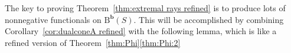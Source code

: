 \documentclass[12pt]{amsart}
\newtheorem{lemma}{Lemma}[section]
\theoremstyle{definition}
\theoremstyle{remark}
\newcommand{\PP}{\mathbb{P}}
\newcommand{\bb}{\mathbf{b}}
\newcommand{\cE}{\mathcal{E}}
\newcommand{\FF}{\mathbf{F}}
\newcommand{\DD}{\mathrm{D}}
\newcommand{\BBQ}{\mathrm{B}}
\begin{document}
The key to proving Theorem~\ref{thm:extremal rays refined} is to produce lots of nonnegative functionals on $\BBQ^{\bb}(S)$.  This will be accomplished by combining Corollary~\ref{cor:dualconeA refined} with the following lemma, which is like a refined version of Theorem~\ref{thm:Phi}\eqref{thm:Phi:2}


\end{document}
